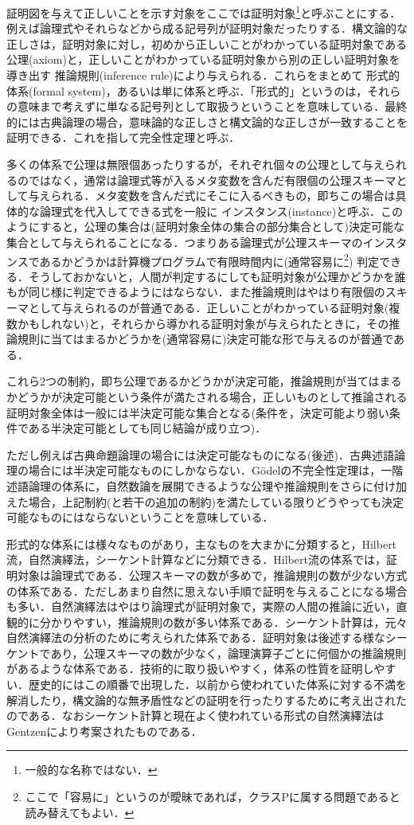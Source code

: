 \documentclass{ltjsarticle}
\theoremstyle{mystyle1}
\theoremstyle{mystyle3}
\theoremstyle{mystyle2}
\newcommand{\red}[1]{{\color{red} #1}}
\begin{document}
証明図を与えて正しいことを示す対象をここでは証明対象\footnote{一般的な名称ではない．}と呼ぶことにする．例えば論理式やそれらなどから成る記号列が証明対象だったりする．構文論的な正しさは，証明対象に対し，初めから正しいことがわかっている証明対象である\red{公理}(axiom)と，正しいことがわかっている証明対象から別の正しい証明対象を導き出す\red{推論規則}(inference rule)により与えられる．これらをまとめて\red{形式的体系}(formal system)，あるいは単に体系と呼ぶ．「形式的」というのは，それらの意味まで考えずに単なる記号列として取扱うということを意味している．最終的には古典論理の場合，意味論的な正しさと構文論的な正しさが一致することを証明できる．これを指して完全性定理と呼ぶ．

多くの体系で公理は無限個あったりするが，それぞれ個々の公理として与えられるのではなく，通常は論理式等が入るメタ変数を含んだ有限個の公理スキーマとして与えられる．メタ変数を含んだ式にそこに入るべきもの，即ちこの場合は具体的な論理式を代入してできる式を一般に\red{インスタンス}(instance)と呼ぶ．このようにすると，公理の集合は(証明対象全体の集合の部分集合として)決定可能な集合として与えられることになる．つまりある論理式が公理スキーマのインスタンスであるかどうかは計算機プログラムで有限時間内に(通常容易に\footnote{ここで「容易に」というのが曖昧であれば，クラスPに属する問題であると読み替えてもよい．}) 判定できる．そうしておかないと，人間が判定するにしても証明対象が公理かどうかを誰もが同じ様に判定できるようにはならない．また推論規則はやはり有限個のスキーマとして与えられるのが普通である．正しいことがわかっている証明対象(複数かもしれない)と，それらから導かれる証明対象が与えられたときに，その推論規則に当てはまるかどうかを(通常容易に)決定可能な形で与えるのが普通である．

これら2つの制約，即ち公理であるかどうかが決定可能，推論規則が当てはまるかどうかが決定可能という条件が満たされる場合，正しいものとして推論される証明対象全体は一般には半決定可能な集合となる(条件を，決定可能より弱い条件である半決定可能としても同じ結論が成り立つ)．

ただし例えば古典命題論理の場合には決定可能なものになる(後述)．古典述語論理の場合には半決定可能なものにしかならない．G\"{o}delの不完全性定理は，一階述語論理の体系に，自然数論を展開できるような公理や推論規則をさらに付け加えた場合，上記制約(と若干の追加の制約)を満たしている限りどうやっても決定可能なものにはならないということを意味している．

形式的な体系には様々なものがあり，主なものを大まかに分類すると，Hilbert流，自然演繹法，シーケント計算などに分類できる．Hilbert流の体系では，証明対象は論理式である．公理スキーマの数が多めで，推論規則の数が少ない方式の体系である．ただしあまり自然に思えない手順で証明を与えることになる場合も多い．自然演繹法はやはり論理式が証明対象で，実際の人間の推論に近い，直観的に分かりやすい，推論規則の数が多い体系である．シーケント計算は，元々自然演繹法の分析のために考えられた体系である．証明対象は後述する様なシーケントであり，公理スキーマの数が少なく，論理演算子ごとに何個かの推論規則があるような体系である．技術的に取り扱いやすく，体系の性質を証明しやすい．歴史的にはこの順番で出現した．以前から使われていた体系に対する不満を解消したり，構文論的な無矛盾性などの証明を行ったりするために考え出されたのである．なおシーケント計算と現在よく使われている形式の自然演繹法はGentzenにより考案されたものである．
\end{document}
